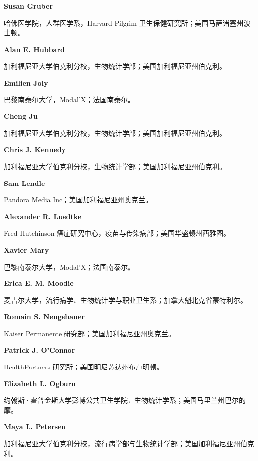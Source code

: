 \noindent\textbf{Susan Gruber}\par
哈佛医学院，人群医学系，Harvard Pilgrim 卫生保健研究所；美国马萨诸塞州波士顿。

\noindent\textbf{Alan E. Hubbard}\par
加利福尼亚大学伯克利分校，生物统计学部；美国加利福尼亚州伯克利。

\noindent\textbf{Emilien Joly}\par
巴黎南泰尔大学，Modal'X；法国南泰尔。

\noindent\textbf{Cheng Ju}\par
加利福尼亚大学伯克利分校，生物统计学部；美国加利福尼亚州伯克利。

\noindent\textbf{Chris J. Kennedy}\par
加利福尼亚大学伯克利分校，生物统计学部；美国加利福尼亚州伯克利。

\noindent\textbf{Sam Lendle}\par
Pandora Media Inc；美国加利福尼亚州奥克兰。

\noindent\textbf{Alexander R. Luedtke}\par
Fred Hutchinson 癌症研究中心，疫苗与传染病部；美国华盛顿州西雅图。

\noindent\textbf{Xavier Mary}\par
巴黎南泰尔大学，Modal'X；法国南泰尔。

\noindent\textbf{Erica E. M. Moodie}\par
麦吉尔大学，流行病学、生物统计学与职业卫生系；加拿大魁北克省蒙特利尔。

\noindent\textbf{Romain S. Neugebauer}\par
Kaiser Permanente 研究部；美国加利福尼亚州奥克兰。

\noindent\textbf{Patrick J. O'Connor}\par
HealthPartners 研究所；美国明尼苏达州布卢明顿。

\noindent\textbf{Elizabeth L. Ogburn}\par
约翰斯·霍普金斯大学彭博公共卫生学院，生物统计学系；美国马里兰州巴尔的摩。

\noindent\textbf{Maya L. Petersen}\par
加利福尼亚大学伯克利分校，流行病学部与生物统计学部；美国加利福尼亚州伯克利。

